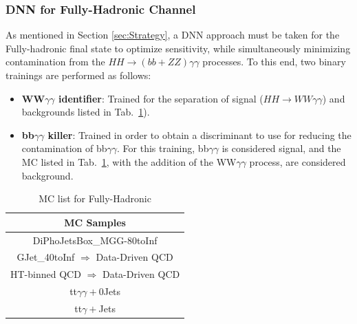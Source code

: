 
\subsubsection{DNN for Fully-Hadronic Channel}
\label{subsubsec:FullyHadronicDNN}
As mentioned in Section \ref{sec:Strategy}, a DNN approach must be taken for the Fully-hadronic final state to optimize sensitivity, while simultaneously minimizing
contamination from the $HH \rightarrow (bb + ZZ)\gamma\gamma$ processes. To this end, two binary trainings are performed as follows:

\begin{itemize}
  \item \textbf{WW$\gamma\gamma$ identifier}: Trained for the separation of signal ($HH \rightarrow WW\gamma\gamma$) and backgrounds listed in Tab.~\ref{tab:fullyHadronicMCBkg}).
  \item \textbf{bb$\gamma\gamma$ killer}: Trained in order to obtain a discriminant to use for reducing the contamination of bb$\gamma\gamma$. For this training, bb$\gamma\gamma$ is considered signal,
  and the MC listed in Tab.~\ref{tab:fullyHadronicMCBkg}, with the addition of the WW$\gamma\gamma$ process, are considered background.
\end{itemize}
\begin{table}[!htbp]
  \begin{center}
          \begin{tabular}{|c|}
                \hline
                \textbf{MC Samples}  \\ \hline
                DiPhoJetsBox\_MGG-80toInf  \\ \hline
                GJet\_40toInf $\Rightarrow$ Data-Driven QCD \\ \hline
                HT-binned QCD  $\Rightarrow$ Data-Driven QCD\\ \hline
                tt$\gamma\gamma+$0Jets  \\ \hline
                tt$\gamma+$Jets  \\ \hline
          \end{tabular}
  \caption{MC list for Fully-Hadronic}
  \label{tab:fullyHadronicMCBkg}
  \end{center}
\end{table}

